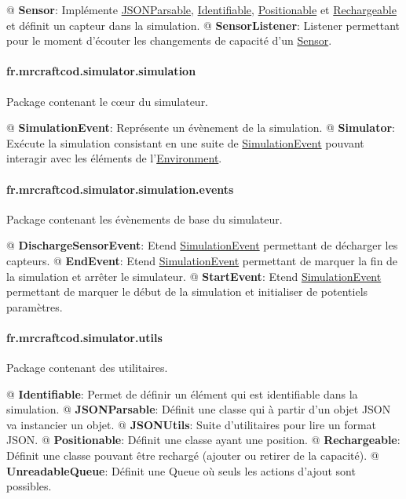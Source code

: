 \documentclass[final]{polytech/polytech}
\newcommand{\class}[1]{\textbf{#1}\label{class:#1}}
\newcommand{\klass}[1]{\hyperref[class:#1]{#1}}
\begin{document}
				\begin{easylist}
					@ \class{Sensor}: Implémente \klass{JSONParsable}, \klass{Identifiable}, \klass{Positionable} et \klass{Rechargeable} et définit un capteur dans la simulation.
					@ \class{SensorListener}: Listener permettant pour le moment d'écouter les changements de capacité d'un \klass{Sensor}.
				\end{easylist}
				
			\paragraph{fr.mrcraftcod.simulator.simulation}
				Package contenant le c\oe ur du simulateur.
				
				\begin{easylist}
					@ \class{SimulationEvent}: Représente un évènement de la simulation.
					@ \class{Simulator}: Exécute la simulation consistant en une suite de \klass{SimulationEvent} pouvant interagir avec les éléments de l'\klass{Environment}.
				\end{easylist}
				
			\paragraph{fr.mrcraftcod.simulator.simulation.events}
				Package contenant les évènements de base du simulateur.
				
				\begin{easylist}
					@ \class{DischargeSensorEvent}: Etend \klass{SimulationEvent} permettant de décharger les capteurs.
					@ \class{EndEvent}: Etend \klass{SimulationEvent} permettant de marquer la fin de la simulation et arrêter le simulateur.
					@ \class{StartEvent}: Etend \klass{SimulationEvent} permettant de marquer le début de la simulation et initialiser de potentiels paramètres.
				\end{easylist}
				
			\paragraph{fr.mrcraftcod.simulator.utils}
				Package contenant des utilitaires.
				
				\begin{easylist}
					@ \class{Identifiable}: Permet de définir un élément qui est identifiable dans la simulation.
					@ \class{JSONParsable}: Définit une classe qui à partir d'un objet JSON va instancier un objet.
					@ \class{JSONUtils}: Suite d'utilitaires pour lire un format JSON.
					@ \class{Positionable}: Définit une classe ayant une position.
					@ \class{Rechargeable}: Définit une classe pouvant être rechargé (ajouter ou retirer de la capacité).
					@ \class{UnreadableQueue}: Définit une Queue où seuls les actions d'ajout sont possibles.
				\end{easylist}
		
\end{document}
